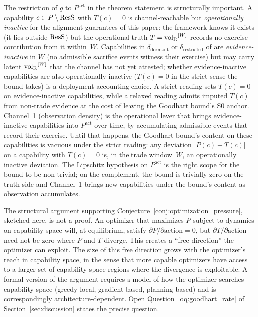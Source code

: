 \begin{remark}[Capabilities with $T(c) = 0$ are evidence-inactive in $W$]
\label{rem:zero_T_inactive}
The restriction of $g$ to $P^{\mathrm{act}}$ in the theorem
statement is structurally important.  A capability $c \in
P \setminus \mathrm{ResS}$ with $T(c) = 0$ is channel-reachable but
\emph{operationally inactive} for the alignment guarantees of
this paper: the framework knows it exists (it lies outside
$\mathrm{ResS}$) but the operational truth $T = {\operatorname{vol}_{\mathrm{R}}}^{[W]}$ records no
exercise contribution from it within~$W$.  Capabilities in
$\delta_{\mathrm{dormant}}$ or $\delta_{\mathrm{restricted}}$
of \citep[Definition~8]{lasser2026paper8b} are
\emph{evidence-inactive} in $W$ (no admissible sacrifice events
witness their exercise) but may carry latent
${\operatorname{vol}_{\mathrm{R}}}^{[W]}$ that the channel has not yet attested; whether
evidence-inactive capabilities are also operationally inactive
($T(c) = 0$ in the strict sense the bound takes) is a deployment
accounting choice.  A strict reading sets $T(c) = 0$ on
evidence-inactive capabilities, while a relaxed reading admits
imputed $T(c)$ from non-trade evidence at the cost of leaving
the Goodhart bound's S0 anchor.  Channel~1 (observation density)
is the operational lever that brings evidence-inactive
capabilities into $P^{\mathrm{act}}$ over time, by accumulating
admissible events that record their exercise.  Until that
happens, the Goodhart bound's content on these capabilities is
vacuous under the strict reading: any deviation
$|P(c) - T(c)|$ on a capability with $T(c) = 0$ is, in the trade
window~$W$, an operationally inactive deviation.  The Lipschitz
hypothesis on $P^{\mathrm{act}}$ is the right scope for the
bound to be non-trivial; on the complement, the bound is
trivially zero on the truth side and Channel~1 brings new
capabilities under the
bound's content as observation accumulates.
\end{remark}

\begin{remark}
\label{rem:conj1_structural}
The structural argument supporting
Conjecture~\ref{conj:optimization_pressure}, sketched here, is
not a proof.  An optimizer that maximizes $P$ subject to
dynamics on capability space will, at equilibrium, satisfy
$\partial P / \partial \mathrm{action} = 0$, but
$\partial T / \partial \mathrm{action}$ need not be zero where
$P$ and $T$ diverge.  This creates a ``free direction'' the
optimizer can exploit.  The size of this free direction grows
with the optimizer's reach in capability space, in the sense
that more capable optimizers have access to a larger set of
capability-space regions where the divergence is exploitable.
A formal version of the argument requires a model of how the
optimizer searches capability space (greedy local,
gradient-based, planning-based) and is correspondingly
architecture-dependent.  Open Question~\ref{oq:goodhart_rate}
of Section~\ref{sec:discussion} states the precise question.
\end{remark}

